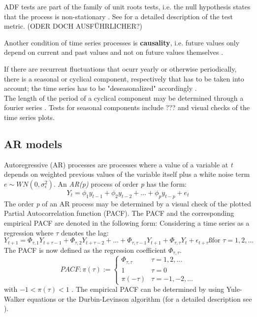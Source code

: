\documentclass[a4paper, 11pt]{article}
\begin{document}
ADF tests are part of the family of unit roots tests, i.e. the null hypothesis states that the process is non-stationary \citep{Zhao.07022018}. See \cite{Vogel.2015} for a detailed description of the test metric. (ODER DOCH AUSFÜHRLICHER?)

Another condition of time series processes is \textbf{causality}, i.e. future values only depend on current and past values and not on future values themselves \citep{Vogel.2015}.

If there are recurrent fluctuations that ocurr yearly or otherwise periodically, there is a seasonal or cyclical component, respectively \citep{Vogel.2015} that has to be taken into account; the time series has to be "deseasonalized" accordingly \citep{Benkachcha.2015}.\\ The length of the period of a cyclical component may be determined through a fourier series \citep{Vogel.2015}.
Tests for seasonal components include ??? and visual checks of the time series plots.

\subsection{AR models}
Autoregressive (AR) processes are processes where a value of a variable at \textit{t} depends on weighted previous values of the variable itself plus a white noise term $e \sim  WN(0, \sigma_{\epsilon}^2)$. An \textit{AR(p)} process of order \textit{p} has the form:
\begin{equation}
	Y_{t} = \phi_{1} y_{t-1} + \phi_{2} y_{t-2} + ... + \phi_{p} y_{t-p} +e_{t}
\end{equation}
The order \textit{p} of an AR process may be determined by a visual check of the plotted Partial Autocorrelation function (PACF). 
The PACF and the corresponding empirical PACF are denoted in the following form:
Considering a time series as a regression where $\tau$ denotes the lag:
\begin{equation}
Y_{t+1} = \Phi_{\tau,1}Y_{t+\tau-1} + \Phi_{\tau,2}Y_{t+\tau-2} + ... + \Phi_{\tau,\tau - 1}Y_{t+1} + \Phi_{\tau,\tau}Y_{t} + \epsilon_{t+\tau} ß \text{for $\tau = 1, 2, ...$}  
\end{equation}
The PACF is now defined as the regression coefficient $\Phi_{\tau,\tau}$.
\begin{equation}
PACF: \pi(\tau):= \begin{cases}
\Phi_{\tau,\tau} & \tau = 1, 2, ... \\
1 & \tau = 0 \\
\pi(-\tau) & \tau = -1, -2, ...
\end{cases}
\end{equation}
with 
$-1 < \pi(\tau) < 1$ \citep{Vogel.2015}. The empirical PACF can be determined by using Yule-Walker equations or the Durbin-Levinson algorithm (for a detailed description see \citep{Vogel.2015}).
\end{document}
